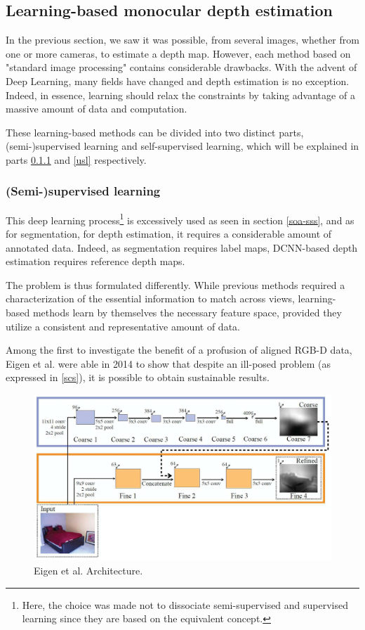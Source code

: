 \subsection{Learning-based monocular depth estimation}\label{mono-im}

In the previous section, we saw it was possible, from several images, whether from one or more cameras, to estimate a depth map. However, each method based on "standard image processing" contains considerable drawbacks. 
With the advent of Deep Learning, many fields have changed and depth estimation is no exception. Indeed, in essence, learning should relax the constraints by taking advantage of a massive amount of data and computation. 

These learning-based methods can be divided into two distinct parts, (semi-)supervised learning and self-supervised learning, which will be explained in parts \ref{ssl} and \ref{usl} respectively.

\subsubsection{(Semi-)supervised learning}\label{ssl}

This deep learning process\footnote{Here, the choice was made not to dissociate semi-supervised and supervised learning since they are based on the equivalent concept.} is excessively used as seen in section \ref{soa-sss}, and as for segmentation, for depth estimation, it requires a considerable amount of annotated data. Indeed, as segmentation requires label maps, DCNN-based depth estimation requires reference depth maps.

The problem is thus formulated differently. While previous methods required a characterization of the essential information to match across views, learning-based methods learn by themselves the necessary feature space, provided they utilize a consistent and representative amount of data.

Among the first to investigate the benefit of a profusion of aligned RGB-D data, Eigen et al.\cite{eigen2014depth} were able in 2014 to show that despite an ill-posed problem (as expressed in \ref{scs}), it is possible to obtain sustainable results.

\begin{figure}[h]
	\centering
	\includegraphics[width=0.8\linewidth]{Figures/SOA/arch-eigen}
	\caption[Eigen et al. Architecture.]{Eigen et al.\cite{eigen2014depth} Architecture.}
	\label{arch-eigen}
\end{figure}


